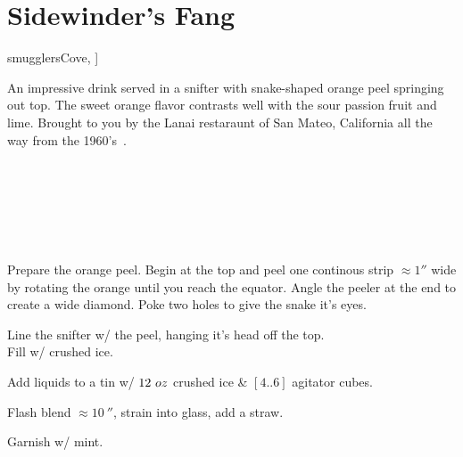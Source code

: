 \section[Sidewinder's Fang]{
    Sidewinder's Fang~
}

\begin{recipestats}[
        servings=1,
        preptime=10~\minute,
        original=\citeauthor{smugglersCove}~\cite[p.~62]{smugglersCove},
    ]
\end{recipestats}

\begin{recipeabstract}
    An impressive drink served in a snifter with snake-shaped orange peel
    springing out top.
    The sweet orange flavor contrasts well with the sour passion fruit and lime.
    Brought to you by the Lanai restaraunt of San Mateo, California all the
    way from the 1960's~\cite{smugglersCove}.
\end{recipeabstract}

\begin{ingredientcolumns}[1]
    \begin{ingredientblock}
        \\
        \\
        \\
        \\
        \\
    \end{ingredientblock}
\end{ingredientcolumns}

\begin{preparation}
\item Prepare the orange peel.
    Begin at the top and peel one continous strip $\approx1''$ wide by
    rotating the orange until you reach the equator.
    Angle the peeler at the end to create a wide diamond.
    Poke two holes to give the snake it's eyes.
\item Line the snifter w/ the peel, hanging it's head off the top.\\
    Fill w/ crushed ice.
\item Add liquids to a tin w/ $12~oz$ crushed ice \& $[4..6]$ agitator cubes.
\item Flash blend $\approx10~\second$, strain into glass, add a straw.
\item Garnish w/ mint.
\end{preparation}

\recipeend%
